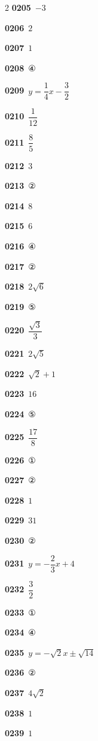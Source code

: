 \documentclass[10pt,a4paper]{article}
\begin{document}
\begin{multicols}{2}
\noindent\textbf{0205}\ $-3$\par
\noindent\textbf{0206}\ $2$\par
\noindent\textbf{0207}\ $1$\par
\noindent\textbf{0208}\ ④\par
\noindent\textbf{0209}\ $y=\dfrac{1}{4}x-\dfrac{3}{2}$\par
\noindent\textbf{0210}\ $\dfrac{1}{12}$\par
\noindent\textbf{0211}\ $\dfrac{8}{5}$\par
\noindent\textbf{0212}\ $3$\par
\noindent\textbf{0213}\ ②\par
\noindent\textbf{0214}\ $8$\par
\noindent\textbf{0215}\ $6$\par
\noindent\textbf{0216}\ ④\par
\noindent\textbf{0217}\ ②\par
\noindent\textbf{0218}\ $2\sqrt{6}$\par
\noindent\textbf{0219}\ ⑤\par
\noindent\textbf{0220}\ $\dfrac{\sqrt{3}}{3}$\par
\noindent\textbf{0221}\ $2\sqrt{5}$\par
\noindent\textbf{0222}\ $\sqrt{2}+1$\par
\noindent\textbf{0223}\ $16$\par
\noindent\textbf{0224}\ ⑤\par
\noindent\textbf{0225}\ $\dfrac{17}{8}$\par
\noindent\textbf{0226}\ ①\par
\noindent\textbf{0227}\ ②\par
\noindent\textbf{0228}\ $1$\par
\noindent\textbf{0229}\ $31$\par
\noindent\textbf{0230}\ ②\par
\noindent\textbf{0231}\ $y=-\dfrac{2}{3}x+4$\par
\noindent\textbf{0232}\ $\dfrac{3}{2}$\par
\noindent\textbf{0233}\ ①\par
\noindent\textbf{0234}\ ④\par
\noindent\textbf{0235}\ $y=-\sqrt{2}x\pm\sqrt{14}$\par
\noindent\textbf{0236}\ ②\par
\noindent\textbf{0237}\ $4\sqrt{2}$\par
\noindent\textbf{0238}\ $1$\par
\noindent\textbf{0239}\ $1$\par

\end{multicols}
\end{document}
